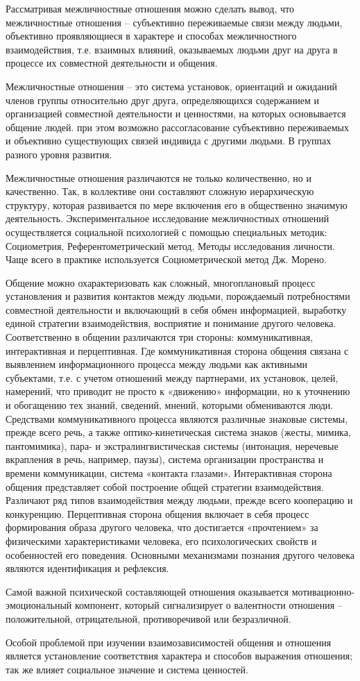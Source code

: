 Рассматривая межличностные отношения можно сделать вывод, что межличностные отношения – субъективно переживаемые связи между людьми, объективно проявляющиеся в характере и способах межличностного взаимодействия, т.е. взаимных влияний, оказываемых людьми друг на друга в процессе их совместной деятельности и общения. 

Межличностные отношения – это система установок, ориентаций и ожиданий членов группы относительно друг друга, определяющихся содержанием и организацией совместной деятельности и ценностями, на которых основывается общение людей. при этом возможно рассогласование субъективно переживаемых и объективно существующих связей индивида с другими людьми. В группах разного уровня развития. 

Межличностные отношения различаются не только количественно, но и качественно. Так, в коллективе они составляют сложную иерархическую структуру, которая развивается по мере включения его в общественно значимую деятельность. Экспериментальное исследование межличностных отношений осуществляется социальной психологией с помощью специальных методик: Социометрия, Референтометрический метод, Методы исследования личности. Чаще всего в практике используется Социометрической метод Дж. Морено. 

Общение можно охарактеризовать как сложный, многоплановый процесс установления и развития контактов между людьми, порождаемый потребностями совместной деятельности и включающий в себя обмен информацией, выработку единой стратегии взаимодействия, восприятие и понимание другого человека. Соответственно в общении различаются три стороны: коммуникативная, интерактивная и перцептивная. Где коммуникативная сторона общения связана с выявлением информационного процесса между людьми как активными субъектами, т.е. с учетом отношений между партнерами, их установок, целей, намерений, что приводит не просто к «движению» информации, но к уточнению и обогащению тех знаний, сведений, мнений, которыми обмениваются люди. Средствами коммуникативного процесса являются различные знаковые системы, прежде всего речь, а также оптико-кинетическая система знаков (жесты, мимика, пантомимика), пара- и экстралингвистическая системы (интонация, неречевые вкрапления в речь, например, паузы), система организации пространства и времени коммуникации, система «контакта глазами». Интерактивная сторона общения представляет собой построение общей стратегии взаимодействия. Различают ряд типов взаимодействия между людьми, прежде всего кооперацию и конкуренцию. Перцептивная сторона общения включает в себя процесс формирования образа другого человека, что достигается «прочтением» за физическими характеристиками человека, его психологических свойств и особенностей его поведения. Основными механизмами познания другого человека являются идентификация и рефлексия. 

Самой важной психической составляющей отношения оказывается мотивационно-эмоциональный компонент, который сигнализирует о валентности отношения – положительной, отрицательной, противоречивой или безразличной. 

Особой проблемой при изучении взаимозависимостей общения и отношения является установление соответствия характера и способов выражения отношения; так же влияет социальное значение и система ценностей. 
